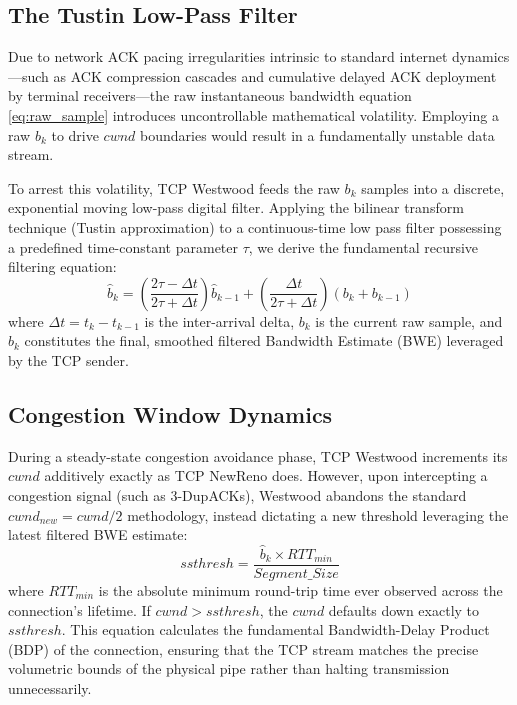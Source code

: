\documentclass[conference,10pt,a4paper]{IEEEtran}
\begin{document}
\subsection{The Tustin Low-Pass Filter}
Due to network ACK pacing irregularities intrinsic to standard internet dynamics—such as ACK compression cascades and cumulative delayed ACK deployment by terminal receivers—the raw instantaneous bandwidth equation \eqref{eq:raw_sample} introduces uncontrollable mathematical volatility. Employing a raw $b_k$ to drive $cwnd$ boundaries would result in a fundamentally unstable data stream.

To arrest this volatility, TCP Westwood feeds the raw $b_k$ samples into a discrete, exponential moving low-pass digital filter. Applying the bilinear transform technique (Tustin approximation) to a continuous-time low pass filter possessing a predefined time-constant parameter $\tau$, we derive the fundamental recursive filtering equation:
\begin{equation}
\hat{b}_k = \left(\frac{2\tau - \Delta t}{2\tau + \Delta t}\right) \hat{b}_{k-1} + \left(\frac{\Delta t}{2\tau + \Delta t}\right) (b_k + b_{k-1})
\end{equation}
where $\Delta t = t_k - t_{k-1}$ is the inter-arrival delta, $b_k$ is the current raw sample, and $\hat{b}_k$ constitutes the final, smoothed filtered Bandwidth Estimate (BWE) leveraged by the TCP sender.

\subsection{Congestion Window Dynamics}
During a steady-state congestion avoidance phase, TCP Westwood increments its $cwnd$ additively exactly as TCP NewReno does. However, upon intercepting a congestion signal (such as 3-DupACKs), Westwood abandons the standard $cwnd_{new} = cwnd / 2$ methodology, instead dictating a new threshold leveraging the latest filtered BWE estimate:
\begin{equation}
ssthresh = \frac{\hat{b}_k \times RTT_{min}}{Segment\_Size}
\label{eq:recovery}
\end{equation}
where $RTT_{min}$ is the absolute minimum round-trip time ever observed across the connection's lifetime. If $cwnd > ssthresh$, the $cwnd$ defaults down exactly to $ssthresh$. This equation calculates the fundamental Bandwidth-Delay Product (BDP) of the connection, ensuring that the TCP stream matches the precise volumetric bounds of the physical pipe rather than halting transmission unnecessarily.
\end{document}
